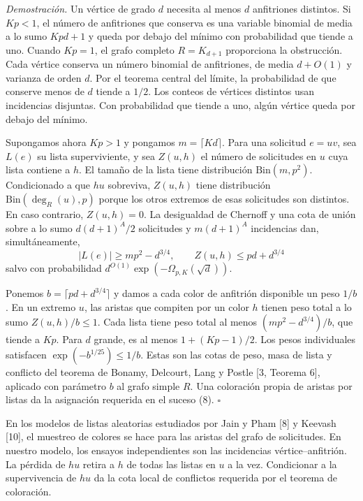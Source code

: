 \documentclass[spanish,11pt,a4paper]{article}
\begin{document}
\emph{Demostración.} Un vértice de grado \(d\) necesita al menos \(d\) anfitriones distintos. Si \(Kp<1\), el número de anfitriones que conserva es una variable binomial de media a lo sumo \(Kpd+1\) y queda por debajo del mínimo con probabilidad que tiende a uno. Cuando \(Kp=1\), el grafo completo \(R=K_{d+1}\) proporciona la obstrucción. Cada vértice conserva un número binomial de anfitriones, de media \(d+O(1)\) y varianza de orden \(d\). Por el teorema central del límite, la probabilidad de que conserve menos de \(d\) tiende a \(1/2\). Los conteos de vértices distintos usan incidencias disjuntas. Con probabilidad que tiende a uno, algún vértice queda por debajo del mínimo.

Supongamos ahora \(Kp>1\) y pongamos \(m=\lceil Kd\rceil\). Para una solicitud \(e=uv\), sea \(L(e)\) su lista superviviente, y sea \(Z(u,h)\) el número de solicitudes en \(u\) cuya lista contiene a \(h\). El tamaño de la lista tiene distribución \(\mathrm{Bin}(m,p^2)\). Condicionado a que \(hu\) sobreviva, \(Z(u,h)\) tiene distribución \(\mathrm{Bin}(\deg_R(u),p)\) porque los otros extremos de esas solicitudes son distintos. En caso contrario, \(Z(u,h)=0\). La desigualdad de Chernoff y una cota de unión sobre a lo sumo \(d(d+1)^A/2\) solicitudes y \(m(d+1)^A\) incidencias dan, simultáneamente, \[|L(e)|\ge mp^2-d^{3/4},\qquad Z(u,h)\le pd+d^{3/4}
 \tag{8}\] salvo con probabilidad \(d^{O(1)}\exp(-\Omega_{p,K}(\sqrt d))\).

Ponemos \(b=\lceil pd+d^{3/4}\rceil\) y damos a cada color de anfitrión disponible un peso \(1/b\). En un extremo \(u\), las aristas que compiten por un color \(h\) tienen peso total a lo sumo \(Z(u,h)/b\le1\). Cada lista tiene peso total al menos \((mp^2-d^{3/4})/b\), que tiende a \(Kp\). Para \(d\) grande, es al menos \(1+(Kp-1)/2\). Los pesos individuales satisfacen \(\exp(-b^{1/25})\le1/b\). Estas son las cotas de peso, masa de lista y conflicto del teorema de Bonamy, Delcourt, Lang y Postle {[}3, Teorema 6{]}, aplicado con parámetro \(b\) al grafo simple \(R\). Una coloración propia de aristas por listas da la asignación requerida en el suceso (8). \(\square\)

En los modelos de listas aleatorias estudiados por Jain y Pham {[}8{]} y Keevash {[}10{]}, el muestreo de colores se hace para las aristas del grafo de solicitudes. En nuestro modelo, los ensayos independientes son las incidencias vértice--anfitrión. La pérdida de \(hu\) retira a \(h\) de todas las listas en \(u\) a la vez. Condicionar a la supervivencia de \(hu\) da la cota local de conflictos requerida por el teorema de coloración.
\end{document}
